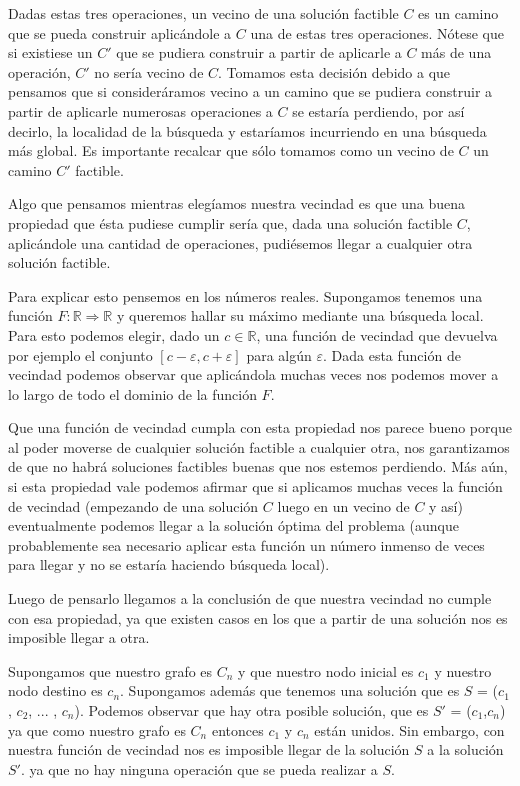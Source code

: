 Dadas estas tres operaciones, un vecino de una solución factible $C$ es un camino que se pueda construir aplicándole a $C$ una de estas tres operaciones. Nótese que si existiese un $C'$ que se pudiera construir a partir de aplicarle a $C$ más de una operación, $C'$ no sería vecino de $C$. Tomamos esta decisión debido a que pensamos que si consideráramos vecino a un camino que se pudiera construir a partir de aplicarle numerosas operaciones a $C$ se estaría perdiendo, por así decirlo, la localidad de la búsqueda y estaríamos incurriendo en una búsqueda más global. Es importante recalcar que sólo tomamos como un vecino de $C$ un camino $C'$ factible.

Algo que pensamos mientras elegíamos nuestra vecindad es que una buena propiedad que ésta pudiese cumplir sería que, dada una solución factible $C$, aplicándole una cantidad de operaciones, pudiésemos llegar a cualquier otra solución factible.

Para explicar esto pensemos en los números reales. Supongamos tenemos una función $F: \mathbb{R} \Rightarrow \mathbb{R}$ y queremos hallar su máximo mediante una búsqueda local. Para esto podemos elegir, dado un $c \in \mathbb{R}$, una función de vecindad que devuelva por ejemplo el conjunto $[c-\varepsilon, c+\varepsilon]$  para algún $\varepsilon$. Dada esta función de vecindad podemos observar que aplicándola muchas veces nos podemos mover a lo largo de todo el dominio de la función $F$.

Que una función de vecindad cumpla con esta propiedad nos parece bueno porque al poder moverse de cualquier solución factible a cualquier otra, nos garantizamos de que no habrá soluciones factibles buenas que nos estemos perdiendo. Más aún, si esta propiedad vale podemos afirmar que si aplicamos muchas veces la función de vecindad (empezando de una solución $C$ luego en un vecino de $C$ y así) eventualmente podemos llegar a la solución óptima del problema (aunque probablemente sea necesario aplicar esta función un número inmenso de veces para llegar y no se estaría haciendo búsqueda local).

Luego de pensarlo llegamos a la conclusión de que nuestra vecindad no cumple con esa propiedad, ya que existen casos en los que a partir de una solución nos es imposible llegar a otra.

Supongamos que nuestro grafo es $C_n$ y que nuestro nodo inicial es $c_1$ y nuestro nodo destino es $c_n$. Supongamos además que tenemos una solución que es $S$ = ($c_1$, $c_2$, ... , $c_n$). Podemos observar que hay otra posible solución, que es $S'$ = ($c_1$,$c_n$) ya que como nuestro grafo es $C_n$ entonces $c_1$ y $c_n$ están unidos. Sin embargo, con nuestra función de vecindad nos es imposible llegar de la solución $S$ a la solución $S'$. ya que no hay ninguna operación que se pueda realizar a $S$. 

